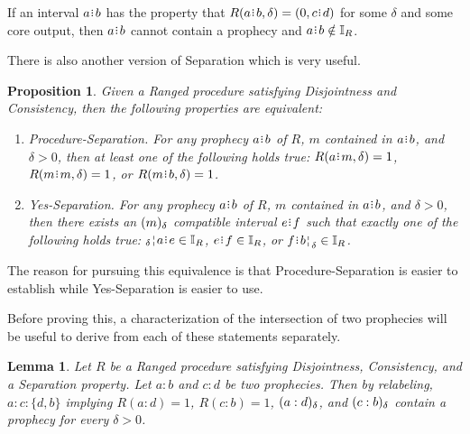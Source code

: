 \documentclass[12pt]{article}
\newtheorem{lemma}{Lemma}[section]
\newtheorem{proposition}{Proposition}[section]
\begin{document}
If an interval $a\rint b$ has the property that $R(a\rint b, \delta) = (0, c\rint d)$ for some $\delta$ and some core output, then $a\rint b$ cannot contain a prophecy and $a\rint b \notin \mathbb{I}_R$. 

There is also another version of Separation which is very useful. 

\begin{proposition}
    Given a Ranged procedure satisfying Disjointness and Consistency, then the following properties are equivalent: 
    \begin{enumerate}
        \item Procedure-Separation. For any prophecy $a\rint b$ of $R$, $m$ contained in $a\rint b$, and $\delta > 0$, then at least one of the following holds true: $R(a \rint m, \delta) =1$, $R(m \rint m, \delta) = 1$, or $R(m \rint b, \delta) = 1$.
        \item Yes-Separation. For any prophecy $a\rint b$ of $R$, $m$ contained in $a\rint b$, and $\delta > 0$, then there exists an $(m)_{\delta}$ compatible interval $e\rint f$ such that exactly one of the following holds true:   $\fuzbleft{a}\rint e \in \mathbb{I}_R$, $e\rint f \in \mathbb{I}_R$,  or $f\rint \fuzbright{b} \in \mathbb{I}_R$.
    \end{enumerate}
\end{proposition}


The reason for pursuing this equivalence is that Procedure-Separation is easier to establish while Yes-Separation is easier to use. 

Before proving this, a characterization of the intersection of two prophecies will be useful to derive from each of these statements separately. 

\begin{lemma}
    Let $R$ be a Ranged procedure satisfying Disjointness, Consistency, and a Separation property. Let $a:b$ and $c:d$ be two prophecies. Then by relabeling, $a:c:\{d,b\}$ implying  $R(a:d)=1$, $R(c:b)=1$, $(a:d)_{\delta}$, and $(c:b)_{\delta}$ contain a prophecy for every $\delta > 0$.
\end{lemma}
\end{document}
